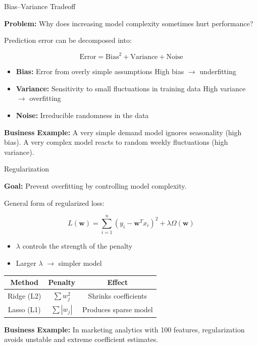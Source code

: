\documentclass{beamer}
\begin{document}
\begin{frame}{Bias--Variance Tradeoff}

\textbf{Problem:} Why does increasing model complexity sometimes hurt performance?

\vspace{0.5cm}

Prediction error can be decomposed into:

\[
\text{Error}
=
\text{Bias}^2
+
\text{Variance}
+
\text{Noise}
\]

\begin{itemize}
    \item \textbf{Bias:} Error from overly simple assumptions  
    High bias $\rightarrow$ underfitting
    \item \textbf{Variance:} Sensitivity to small fluctuations in training data  
    High variance $\rightarrow$ overfitting
    \item \textbf{Noise:} Irreducible randomness in the data
\end{itemize}

\vspace{0.5cm}

\textbf{Business Example:}  
A very simple demand model ignores seasonality (high bias).  
A very complex model reacts to random weekly fluctuations (high variance).

\end{frame}

\begin{frame}{Regularization}

\textbf{Goal:} Prevent overfitting by controlling model complexity.

\vspace{0.5cm}

General form of regularized loss:

\[
L(\mathbf{w})
=
\sum_{i=1}^n (y_i - \mathbf{w}^T x_i)^2
+
\lambda \Omega(\mathbf{w})
\]

\begin{itemize}
    \item $\lambda$ controls the strength of the penalty
    \item Larger $\lambda$ $\rightarrow$ simpler model
\end{itemize}

\vspace{0.3cm}

\begin{tabular}{c|c|c}
Method & Penalty & Effect \\
\hline
Ridge (L2) & $\sum w_j^2$ & Shrinks coefficients \\
Lasso (L1) & $\sum |w_j|$ & Produces sparse model
\end{tabular}

\vspace{0.5cm}

\textbf{Business Example:}  
In marketing analytics with 100 features, regularization avoids unstable and extreme coefficient estimates.

\end{frame}
\end{document}
